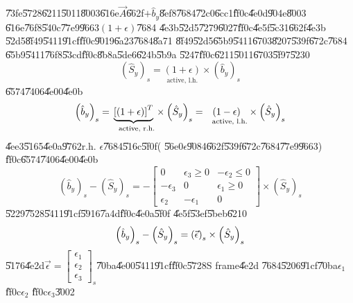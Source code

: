 \documentclass[12pt]{article}
\begin{document}
\bigskip \U{73fe}\U{5728}\U{6211}\U{5011}\U{8003}\U{616e}$\vec{A}$\U{662f}$+%
\hat{b}_{y}$\U{8ef8}\U{7684}\U{72c0}\U{6cc1}\U{ff0c}\U{4e0d}\U{904e}\U{8003}%
\U{616e}\U{76f8}\U{540c}\U{77e9}\U{9663}$\left( 1+\epsilon \right) $\U{7684}%
\U{4e3b}\U{52d5}\U{7279}\U{6027}\U{ff0c}\U{4e5f}\U{5c31}\U{662f}\U{4e3b}%
\U{52d5}\U{8f49}\U{5411}\U{91cf}\U{ff0c}\U{9019}\U{6a23}\U{7684}\U{8a71}%
\U{8f49}\U{52d5}\U{65b9}\U{5411}\U{6703}\U{8207}\U{539f}\U{672c}\U{7684}%
\U{65b9}\U{5411}\U{76f8}\U{53cd}\U{ff0c}\U{8b8a}\U{5de6}\U{624b}\U{5b9a}%
\U{5247}\U{ff0c}\U{6211}\U{5011}\U{6703}\U{5f97}\U{5230}%
\begin{equation*}
\left( \hat{S}_{y}\right) _{s}=\underset{\text{active, l.h.}}{\left(
1+\epsilon \right) }\times \left( \hat{b}_{y}\right) _{s}
\end{equation*}%
\U{6574}\U{7406}\U{4e00}\U{4e0b}%
\begin{equation*}
\left( \hat{b}_{y}\right) _{s}=\underset{\text{active, r.h.}}{\underbrace{%
\left[ \left( 1+\epsilon \right) \right] ^{T}}}\times \left( \hat{S}%
_{y}\right) _{s}=\underset{\text{active, l.h.}}{\left( 1-\epsilon \right) }%
\times \left( \hat{S}_{y}\right) _{s}
\end{equation*}%
\U{4ee3}\U{5165}\U{4e0a}\U{9762}r.h. $\epsilon $\U{7684}\U{516c}\U{5f0f}(%
\U{56e0}$\epsilon $\U{9084}\U{662f}\U{539f}\U{672c}\U{7684}\U{77e9}\U{9663})%
\U{ff0c}\U{6574}\U{7406}\U{4e00}\U{4e0b}%
\begin{equation*}
\left( \hat{b}_{y}\right) _{s}-\left( \hat{S}_{y}\right) _{s}=-\left[ 
\begin{array}{ccc}
0 & \epsilon _{3}\geq 0 & -\epsilon _{2}\leq 0 \\ 
-\epsilon _{3} & 0 & \epsilon _{1}\geq 0 \\ 
\epsilon _{2} & -\epsilon _{1} & 0%
\end{array}%
\right] \times \left( \hat{S}_{y}\right) _{s}
\end{equation*}%
\U{5229}\U{7528}\U{5411}\U{91cf}\U{5916}\U{7a4d}\U{ff0c}\U{4e0a}\U{5f0f}%
\U{4e5f}\U{53ef}\U{5beb}\U{6210}%
\begin{equation*}
\left( \hat{b}_{y}\right) _{s}-\left( \hat{S}_{y}\right) _{s}=\left( \vec{%
\epsilon}\right) _{s}\times \left( \hat{S}_{y}\right) _{s}
\end{equation*}%
\U{5176}\U{4e2d}$\vec{\epsilon}=\left[ 
\begin{array}{c}
\epsilon _{1} \\ 
\epsilon _{2} \\ 
\epsilon _{3}%
\end{array}%
\right] _{s}$\U{70ba}\U{4e00}\U{5411}\U{91cf}\U{ff0c}\U{5728}S frame\U{4e2d}%
\U{7684}\U{5206}\U{91cf}\U{70ba}$\epsilon _{1}$\U{ff0c}$\epsilon _{2}$%
\U{ff0c}$\epsilon _{3}$\U{3002}
\end{document}
